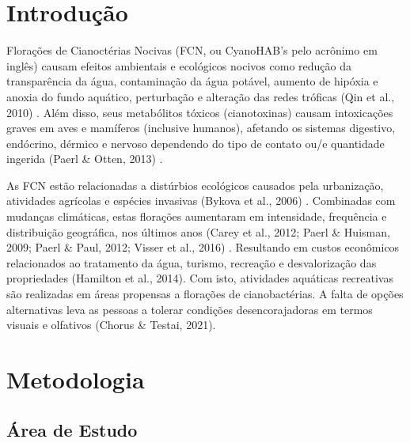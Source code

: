 \documentclass[
  super,
  preprint,
  3p]{elsarticle}
\begin{document}
    \ifdefined\Shaded\renewenvironment{Shaded}{\begin{tcolorbox}[boxrule=0pt, borderline west={3pt}{0pt}{shadecolor}, interior hidden, breakable, sharp corners, enhanced, frame hidden]}{\end{tcolorbox}}\fi

\hypertarget{introduuxe7uxe3o}{%
\section{Introdução}\label{introduuxe7uxe3o}}

Florações de Cianoctérias Nocivas (FCN, ou CyanoHAB's pelo acrônimo em
inglês) causam efeitos ambientais e ecológicos nocivos como redução da
transparência da água, contaminação da água potável, aumento de hipóxia
e anoxia do fundo aquático, perturbação e alteração das redes tróficas
(Qin et al., 2010) \citet{qin}. Além disso, seus metabólitos tóxicos
(cianotoxinas) causam intoxicações graves em aves e mamíferos (inclusive
humanos), afetando os sistemas digestivo, endócrino, dérmico e nervoso
dependendo do tipo de contato ou/e quantidade ingerida (Paerl \& Otten,
2013) \citet{paerl}.

As FCN estão relacionadas a distúrbios ecológicos causados pela
urbanização, atividades agrícolas e espécies invasivas (Bykova et al.,
2006) \citet{bykova}. Combinadas com mudanças climáticas, estas
florações aumentaram em intensidade, frequência e distribuição
geográfica, nos últimos anos (Carey et al., 2012; Paerl \& Huisman,
2009; Paerl \& Paul, 2012; Visser et al., 2016) \citet{carey}
\citet{paerl2} \citet{paerl3} \citet{visser}. Resultando em custos
econômicos relacionados ao tratamento da água, turismo, recreação e
desvalorização das propriedades (Hamilton et al., 2014). Com isto,
atividades aquáticas recreativas são realizadas em áreas propensas a
florações de cianobactérias. A falta de opções alternativas leva as
pessoas a tolerar condições desencorajadoras em termos visuais e
olfativos (Chorus \& Testai, 2021).

\hypertarget{metodologia}{%
\section{Metodologia}\label{metodologia}}

\hypertarget{uxe1rea-de-estudo}{%
\subsection{Área de Estudo}\label{uxe1rea-de-estudo}}
\end{document}
